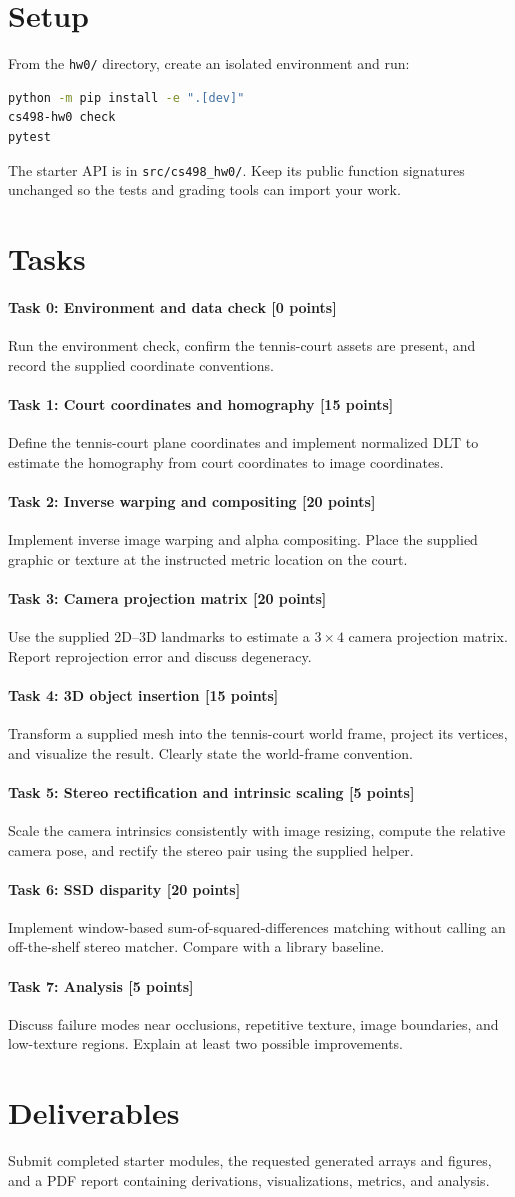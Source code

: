 \documentclass[11pt]{article}
\newcommand{\task}[3]{\paragraph{Task #1: #2 [#3 points]}}
\begin{document}
\section{Setup}
From the \texttt{hw0/} directory, create an isolated environment and run:
\begin{lstlisting}[language=bash]
python -m pip install -e ".[dev]"
cs498-hw0 check
pytest
\end{lstlisting}
The starter API is in \texttt{src/cs498\_hw0/}. Keep its public function
signatures unchanged so the tests and grading tools can import your work.

\section{Tasks}
\task{0}{Environment and data check}{0}
Run the environment check, confirm the tennis-court assets are present, and
record the supplied coordinate conventions.

\task{1}{Court coordinates and homography}{15}
Define the tennis-court plane coordinates and implement normalized DLT to
estimate the homography from court coordinates to image coordinates.

\task{2}{Inverse warping and compositing}{20}
Implement inverse image warping and alpha compositing. Place the supplied
graphic or texture at the instructed metric location on the court.

\task{3}{Camera projection matrix}{20}
Use the supplied 2D--3D landmarks to estimate a $3\times4$ camera projection
matrix. Report reprojection error and discuss degeneracy.

\task{4}{3D object insertion}{15}
Transform a supplied mesh into the tennis-court world frame, project its
vertices, and visualize the result. Clearly state the world-frame convention.

\task{5}{Stereo rectification and intrinsic scaling}{5}
Scale the camera intrinsics consistently with image resizing, compute the
relative camera pose, and rectify the stereo pair using the supplied helper.

\task{6}{SSD disparity}{20}
Implement window-based sum-of-squared-differences matching without calling an
off-the-shelf stereo matcher. Compare with a library baseline.

\task{7}{Analysis}{5}
Discuss failure modes near occlusions, repetitive texture, image boundaries,
and low-texture regions. Explain at least two possible improvements.

\section{Deliverables}
Submit completed starter modules, the requested generated arrays and figures,
and a PDF report containing derivations, visualizations, metrics, and analysis.
\end{document}
